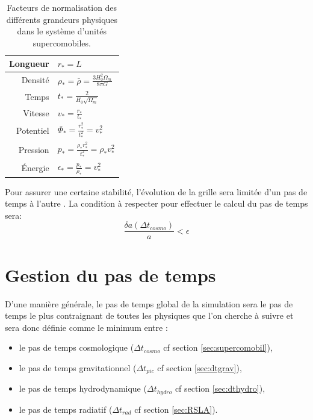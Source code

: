 \begin{table}
\begin{center}
\begin{tabular}{r l} \hline 
Longueur  & $r_*=L$\\ \hline 
Densité & $\rho_* = \bar{\rho} = \frac{3H_0^2 \Omega_m}{8\pi G}$\\ \hline 
Temps & $t_* = \frac{2}{H_0 \sqrt{\Omega_m}}$\\ \hline 
Vitesse & $v_* = \frac{r_*}{t_*}$\\ \hline 
Potentiel & $\Phi_* = \frac{r_*^2}{t_*^2} = v_*^2$\\ \hline 
Pression & $p_* = \frac{\rho_* r_*^2}{t_*^2} = \rho_* v_*^2$\\ \hline 
Énergie & $\epsilon_* = \frac{p_*}{\rho_*} = v_*^2$\\ \hline 
\end{tabular} 
\end{center}
\caption[Facteurs de normalisation]{Facteurs de normalisation des différents grandeurs physiques dans le système d'unités supercomobiles.
\label{tab:comobilfact}}
\end{table}


Pour assurer une certaine stabilité, l'évolution de la grille sera limitée d'un pas de temps à l'autre \citep{teyssier_cosmological_2002}.
La condition à respecter pour effectuer le calcul du pas de temps sera:
\begin{equation}
\frac{\delta a (\Delta t_{cosmo}) } {a} < \epsilon
\end{equation}


\section{Gestion du pas de temps}

D'une manière générale, le pas de temps global de la simulation sera le pas de temps le plus contraignant de toutes les physiques que l'on cherche à suivre et sera donc définie comme le minimum entre :

\begin{itemize}
\item le pas de temps cosmologique ($\Delta t_{cosmo}$ cf section \ref{sec:supercomobil}),
\item le pas de temps gravitationnel ($\Delta t_{pic}$ cf section \ref{sec:dtgrav}),
\item le pas de temps hydrodynamique ($\Delta t_{hydro}$ cf section \ref{sec:dthydro}),
\item le pas de temps radiatif ($\Delta t_{rad}$ cf section \ref{sec:RSLA}).
\end{itemize}

